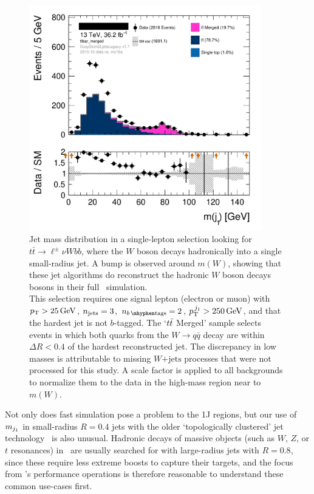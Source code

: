 \begin{figure}[tp]
\centering
\includegraphics[width=0.9\textwidth]{figures/2Ljets_hist1d_jetM0_ttbar_merged_tweak.png}
\caption[
Jet mass distribution in a single-lepton selection looking for
$t\bar t \to \ell^\pm\nu W(J) \bar bb$
]{%
Jet mass distribution in a single-lepton selection looking for
$t\bar t \to \ell^\pm\nu W bb$, where the $W$ boson decays hadronically
into a single small-radius jet.
A bump is observed around $m(W)$, showing that these jet algorithms do
reconstruct the hadronic $W$ boson decays bosons in their full \atlas\
simulation.
\\[0.5em]
This selection requires one signal lepton (electron or muon) with
$\pt > 25\,\eV[G]$, $\njet = 3$, $\nbtag = 2$, $\ptjone > 250\,\eV[G]$,
and that the hardest jet is not $b$-tagged.
The `$\ttbar$ Merged' sample selects events in which both quarks from the
$W\to q\bar q$ decay are within $\Delta R < 0.4$ of the hardest
reconstructed jet.
The discrepancy in low masses is attributable to missing $W\mathrm{+jets}$
processes that were not processed for this study.
A scale factor is applied to all backgrounds to normalize them to the data in
the high-mass region near to $m(W)$.
}
\label{fig:2ljets_jetm_ttbar_mw}
\end{figure}

Not only does fast simulation pose a problem to the 1J regions, but our use
of $\mjetone$ in small-radius $R=0.4$ jets with the older
`topologically clustered' jet technology~\cite{atlas_jet_topo_PERF_2014_07}
is also unusual.
Hadronic decays of massive objects
(such as $W$, $Z$, or $t$ resonances) in \atlas\ are usually searched for with
large-radius jets with $R=0.8$, since these require less extreme boosts to
capture their targets, and the focus from \atlas's performance operations is
therefore reasonable to understand these common use-cases first.

